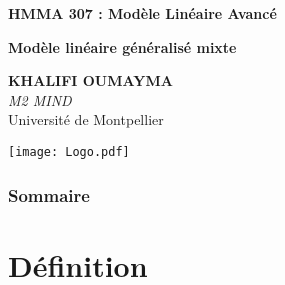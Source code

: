 \documentclass[unknownkeysallowed]{beamer}
\begin{document}
\begin{frame}[noframenumbering]
\thispagestyle{empty}
\bigskip
\bigskip
\begin{center}{
\LARGE\color{marron}
\textbf{HMMA 307 : Modèle Linéaire Avancé}
\textbf{ }\\
\vspace{0.5cm}
}

\color{marron}
\textbf{Modèle linéaire généralisé mixte}
\end{center}

\vspace{0.5cm}

\begin{center}
\textbf{KHALIFI OUMAYMA } \\
\vspace{0.1cm}
\textit{M2 MIND}\\

\vspace{0.5cm}
Université de Montpellier \\
\end{center}

\centering
\texttt{[image: Logo.pdf]}
\end{frame}








\begin{frame}
\frametitle{Sommaire}
\tableofcontents
\end{frame}


\section{Définition}
\end{document}
